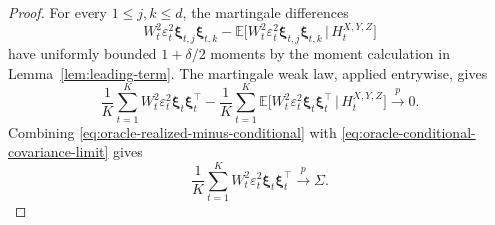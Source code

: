 \documentclass[12pt]{article}
\def\E{\mathbb{E}}
\newcommand\given{\,|\,}
\numberwithin{equation}{section}
\begin{document}
\begin{proof}
{For every \(1\leq j,k\leq d\), the martingale differences
\[
W_t^2\varepsilon_t^2\boldsymbol\xi_{t,j}\boldsymbol\xi_{t,k}
-\E\big[W_t^2\varepsilon_t^2\boldsymbol\xi_{t,j}\boldsymbol\xi_{t,k}
\given H_t^{X,Y,Z}\big]
\]
have uniformly bounded \(1+\delta/2\) moments by the moment calculation
in Lemma~\ref{lem:leading-term}. The martingale weak law, applied entrywise, gives
\begin{equation}
\label{eq:oracle-realized-minus-conditional}
\frac1K\sum_{t=1}^K
W_t^2\varepsilon_t^2\boldsymbol\xi_t\boldsymbol\xi_t^\top
-\frac1K\sum_{t=1}^K
\E\big[W_t^2\varepsilon_t^2\boldsymbol\xi_t\boldsymbol\xi_t^\top
\given H_t^{X,Y,Z}\big]\xrightarrow{p}0.
\end{equation}}
Combining \eqref{eq:oracle-realized-minus-conditional} with
\eqref{eq:oracle-conditional-covariance-limit} gives
\begin{equation}
\label{eq:oracle-second-moment-limit}
\frac{1}{K}\sum_{t=1}^K
W_t^2\varepsilon_t^2
\boldsymbol\xi_t\boldsymbol\xi_t^\top
\xrightarrow{p}\Sigma.
\end{equation}


\end{proof}
\end{document}

